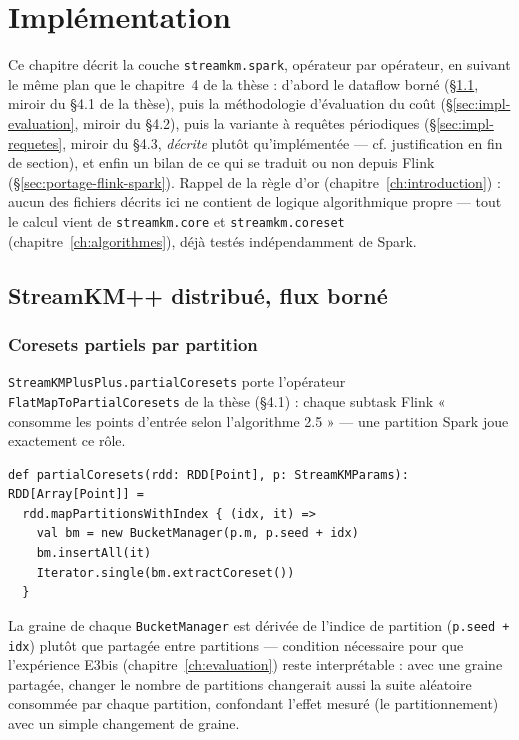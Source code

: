 \chapter{Implémentation}
\label{ch:implementation}

Ce chapitre décrit la couche \texttt{streamkm.spark}, opérateur par
opérateur, en suivant le même plan que le chapitre~4 de la thèse : d'abord
le dataflow borné (§\ref{sec:impl-dataflow}, miroir du §4.1 de la thèse),
puis la méthodologie d'évaluation du coût (§\ref{sec:impl-evaluation},
miroir du §4.2), puis la variante à requêtes périodiques
(§\ref{sec:impl-requetes}, miroir du §4.3, \emph{décrite} plutôt
qu'implémentée --- cf. justification en fin de section), et enfin un bilan
de ce qui se traduit ou non depuis Flink (§\ref{sec:portage-flink-spark}).
Rappel de la règle d'or (chapitre~\ref{ch:introduction}) : aucun des
fichiers décrits ici ne contient de logique algorithmique propre --- tout le
calcul vient de \texttt{streamkm.core} et \texttt{streamkm.coreset}
(chapitre~\ref{ch:algorithmes}), déjà testés indépendamment de Spark.

\section{StreamKM++ distribué, flux borné}
\label{sec:impl-dataflow}

\subsection{Coresets partiels par partition}

\texttt{StreamKMPlusPlus.partialCoresets} porte l'opérateur
\texttt{FlatMapToPartialCoresets} de la thèse (§4.1) : chaque subtask Flink
« consomme les points d'entrée selon l'algorithme 2.5 » --- une partition
Spark joue exactement ce rôle.

\begin{verbatim}
def partialCoresets(rdd: RDD[Point], p: StreamKMParams): RDD[Array[Point]] =
  rdd.mapPartitionsWithIndex { (idx, it) =>
    val bm = new BucketManager(p.m, p.seed + idx)
    bm.insertAll(it)
    Iterator.single(bm.extractCoreset())
  }
\end{verbatim}

La graine de chaque \texttt{BucketManager} est dérivée de l'indice de
partition (\texttt{p.seed + idx}) plutôt que partagée entre partitions ---
condition nécessaire pour que l'expérience E3bis
(chapitre~\ref{ch:evaluation}) reste interprétable : avec une graine
partagée, changer le nombre de partitions changerait aussi la suite
aléatoire consommée par chaque partition, confondant l'effet mesuré (le
partitionnement) avec un simple changement de graine.

